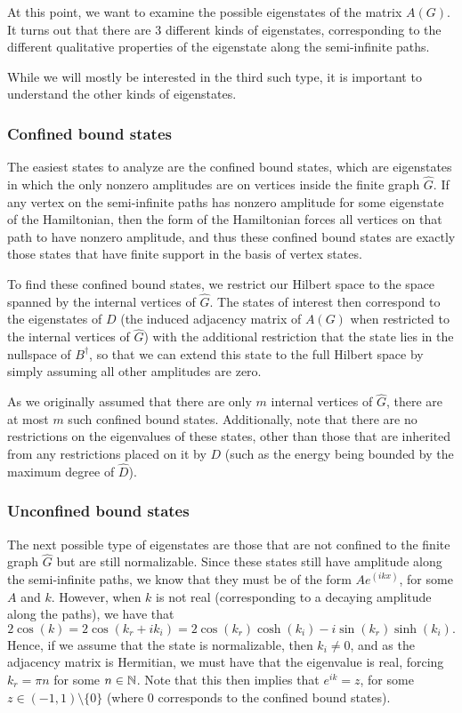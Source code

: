 \documentclass[../thesis-main/thesis-main]{subfiles}
\begin{document}
At this point, we want to examine the possible eigenstates of the matrix $A(G)$.  It turns out that there are 3 different kinds of eigenstates, corresponding to the different qualitative properties of the eigenstate along the semi-infinite paths.

While we will mostly be interested in the third such type, it is important to understand the other kinds of eigenstates.

\subsubsection{Confined bound states}

The easiest states to analyze are the confined bound states, which are eigenstates in which the only nonzero amplitudes are on vertices inside the finite graph $\widehat{G}$. If any vertex on the semi-infinite paths has nonzero amplitude for some eigenstate of the Hamiltonian, then the form of the Hamiltonian forces all vertices on that path to have nonzero amplitude, and thus these confined bound states are exactly those states that have finite support in the basis of vertex states.  

To find these confined bound states, we restrict our Hilbert space to the space spanned by the internal vertices of $\widehat{G}$. The states of interest then correspond to the eigenstates of $D$ (the induced adjacency matrix of $A(G)$ when restricted to the internal vertices of $\widehat{G}$) with the additional restriction that the state lies in the nullspace of $B^\dag$, so that we can extend this state to the full Hilbert space by simply assuming all other amplitudes are zero.    

As we originally assumed that there are only $m$ internal vertices of $\widehat{G}$, there are at most $m$ such confined bound states.  Additionally, note that there are no restrictions on the eigenvalues of these states, other than those that are inherited from any restrictions placed on it by $D$ (such as the energy being bounded by the maximum degree of $\widehat{D}$).

\subsubsection{Unconfined bound states}

The next possible type of eigenstates are those that are not confined to the finite graph $\widehat{G}$ but are still normalizable.  Since these states still have amplitude along the semi-infinite paths, we know that they must be of the form $Ae^(i k x)$, for some $A$ and $k$.  However, when $k$ is not real (corresponding to a decaying amplitude along the paths), we have that
\begin{equation}
  2 \cos(k) = 2\cos(k_r + i k_i) = 2 \cos(k_r) \cosh(k_i) - i \sin(k_r) \sinh(k_i).
\end{equation}
Hence, if we assume that the state is normalizable, then $k_i \neq 0$, and as the adjacency matrix is Hermitian, we must have that the eigenvalue is real, forcing $k_r = \pi n$ for some $n\in \mathbb{N}$.  Note that this then implies that $e^{i k} = z$, for some $z\in(-1,1)\setminus\{0\}$ (where $0$ corresponds to the confined bound states).
\end{document}
